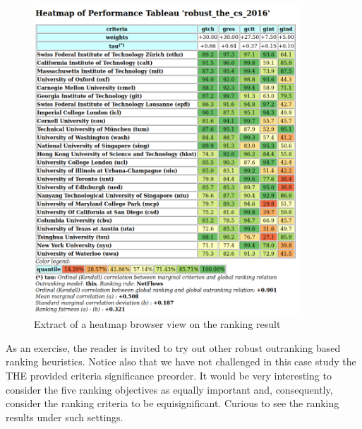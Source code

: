 \begin{figure}[h]
\includegraphics[width=10cm]{Figures/theHeatmap.png}
\caption{Extract of a heatmap browser view on the \NetFlows ranking result}
\label{fig:13.4}       %
\end{figure}

As an exercise, the reader is invited to try out other robust outranking based ranking heuristics. Notice also that we have not challenged in this case study the THE provided criteria significance preorder. It would be very interesting to consider the five ranking objectives as equally important and, consequently, consider the ranking criteria to be equisignificant. Curious to see the ranking results under such settings.
 
